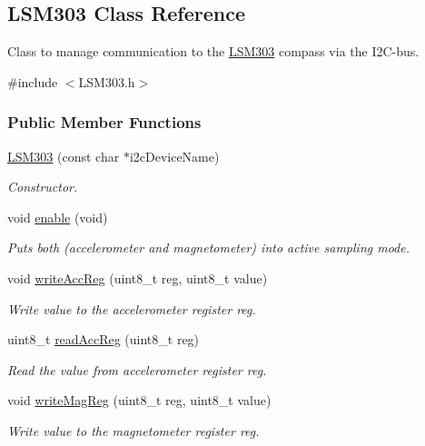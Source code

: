 \hypertarget{class_l_s_m303}{\subsection{\-L\-S\-M303 \-Class \-Reference}
\label{class_l_s_m303}
}


\-Class to manage communication to the \hyperlink{class_l_s_m303}{\-L\-S\-M303} compass via the \-I2\-C-\/bus.  




{\ttfamily \#include $<$\-L\-S\-M303.\-h$>$}

\subsubsection*{\-Public \-Member \-Functions}
\begin{DoxyCompactItemize}
\item 
\hyperlink{class_l_s_m303_a372710f74d63e809ef08348d919a2842}{\-L\-S\-M303} (const char $\ast$i2c\-Device\-Name)
\begin{DoxyCompactList}\small\item\em \-Constructor. \end{DoxyCompactList}\item 
void \hyperlink{class_l_s_m303_af2c1baa290df19e7cd4667a13a68a19a}{enable} (void)
\begin{DoxyCompactList}\small\item\em \-Puts both (accelerometer and magnetometer) into active sampling mode. \end{DoxyCompactList}\item 
void \hyperlink{class_l_s_m303_a3baf5341cf9d7d789b81b1cec7e81f12}{write\-Acc\-Reg} (uint8\-\_\-t reg, uint8\-\_\-t value)
\begin{DoxyCompactList}\small\item\em \-Write value to the accelerometer register reg. \end{DoxyCompactList}\item 
uint8\-\_\-t \hyperlink{class_l_s_m303_a26ba086aec95c01c05e6b980383d1ed9}{read\-Acc\-Reg} (uint8\-\_\-t reg)
\begin{DoxyCompactList}\small\item\em \-Read the value from accelerometer register reg. \end{DoxyCompactList}\item 
void \hyperlink{class_l_s_m303_a70b49953d20ff311bc23dfa8c1ec7a4f}{write\-Mag\-Reg} (uint8\-\_\-t reg, uint8\-\_\-t value)
\begin{DoxyCompactList}\small\item\em \-Write value to the magnetometer register reg. \end{DoxyCompactList}\item 

\end{DoxyCompactItemize}

